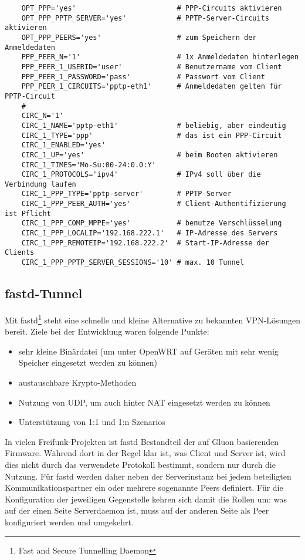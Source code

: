 \begin{example}
\begin{verbatim}
    OPT_PPP='yes'                        # PPP-Circuits aktivieren
    OPT_PPP_PPTP_SERVER='yes'            # PPTP-Server-Circuits aktivieren
    OPT_PPP_PEERS='yes'                  # zum Speichern der Anmeldedaten
    PPP_PEER_N='1'                       # 1x Anmeldedaten hinterlegen
    PPP_PEER_1_USERID='user'             # Benutzername vom Client
    PPP_PEER_1_PASSWORD='pass'           # Passwort vom Client
    PPP_PEER_1_CIRCUITS='pptp-eth1'      # Anmeldedaten gelten für PPTP-Circuit
    #
    CIRC_N='1'
    CIRC_1_NAME='pptp-eth1'              # beliebig, aber eindeutig
    CIRC_1_TYPE='ppp'                    # das ist ein PPP-Circuit
    CIRC_1_ENABLED='yes'
    CIRC_1_UP='yes'                      # beim Booten aktivieren
    CIRC_1_TIMES='Mo-Su:00-24:0.0:Y'
    CIRC_1_PROTOCOLS='ipv4'              # IPv4 soll über die Verbindung laufen
    CIRC_1_PPP_TYPE='pptp-server'        # PPTP-Server
    CIRC_1_PPP_PEER_AUTH='yes'           # Client-Authentifizierung ist Pflicht
    CIRC_1_PPP_COMP_MPPE='yes'           # benutze Verschlüsselung
    CIRC_1_PPP_LOCALIP='192.168.222.1'   # IP-Adresse des Servers
    CIRC_1_PPP_REMOTEIP='192.168.222.2'  # Start-IP-Adresse der Clients
    CIRC_1_PPP_PPTP_SERVER_SESSIONS='10' # max. 10 Tunnel
\end{verbatim}
\end{example}

\subsection{fastd-Tunnel}

Mit fastd\footnote{Fast and Secure Tunnelling Daemon} steht eine
schnelle und kleine Alternative zu bekannten VPN-Lösungen bereit. Ziele
bei der Entwicklung waren folgende Punkte:

\begin{itemize}
	\item sehr kleine Binärdatei (um unter OpenWRT auf Geräten mit sehr
		wenig Speicher eingesetzt werden zu können)
	\item austauschbare Krypto-Methoden
	\item Nutzung von UDP, um auch hinter NAT eingesetzt werden zu können
	\item Unterstützung von 1:1 und 1:n Szenarios
\end{itemize}

In vielen Freifunk-Projekten ist fastd Bestandteil der auf Gluon
basierenden Firmware. Während dort in der Regel \glqq klar\grqq{} ist,
was Client und Server ist, wird dies nicht durch das verwendete
Protokoll bestimmt, sondern nur durch die Nutzung. Für fastd werden
daher neben der Serverinstanz bei jedem beteiligten
Kommunikationspartner ein oder mehrere sogenannte Peers definiert. Für
die Konfiguration der jeweiligen Gegenstelle kehren sich damit die
Rollen um: was auf der einen Seite Serverdaemon ist, muss auf der
anderen Seite als Peer konfiguriert werden und umgekehrt.

